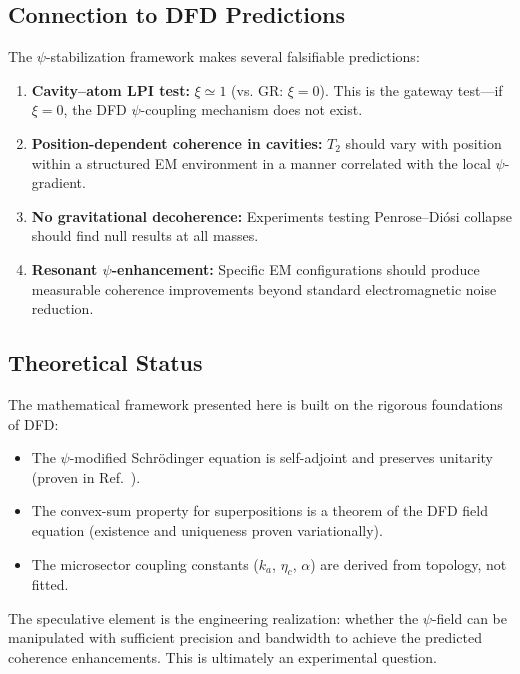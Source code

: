 \documentclass[aps,prd,twocolumn,superscriptaddress,nofootinbib]{revtex4-2}
\begin{document}
\subsection{Connection to DFD Predictions}

The $\psi$-stabilization framework makes several falsifiable predictions:

\begin{enumerate}
\item \textbf{Cavity--atom LPI test:} $\xi \simeq 1$ (vs. GR: $\xi = 0$).
This is the gateway test---if $\xi = 0$, the DFD $\psi$-coupling
mechanism does not exist.
\item \textbf{Position-dependent coherence in cavities:} $T_2$ should
vary with position within a structured EM environment in a manner
correlated with the local $\psi$-gradient.
\item \textbf{No gravitational decoherence:} Experiments testing
Penrose--Di\'osi collapse should find null results at all masses.
\item \textbf{Resonant $\psi$-enhancement:} Specific EM configurations
should produce measurable coherence improvements beyond
standard electromagnetic noise reduction.
\end{enumerate}

\subsection{Theoretical Status}

The mathematical framework presented here is built on the rigorous
foundations of DFD:
\begin{itemize}
\item The $\psi$-modified Schr\"odinger equation is self-adjoint and
preserves unitarity (proven in Ref.~\cite{Alcock2025Penrose}).
\item The convex-sum property for superpositions is a theorem of the
DFD field equation (existence and uniqueness proven variationally).
\item The microsector coupling constants ($k_a$, $\eta_c$, $\alpha$)
are derived from topology, not fitted.
\end{itemize}

The speculative element is the engineering realization: whether the
$\psi$-field can be manipulated with sufficient precision and bandwidth
to achieve the predicted coherence enhancements. This is ultimately an
experimental question.

\end{document}
